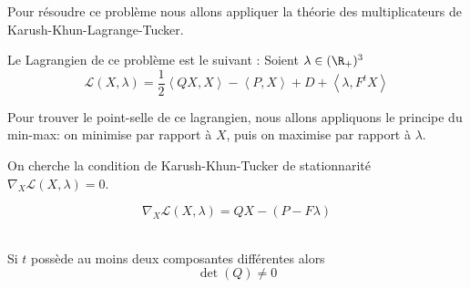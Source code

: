 Pour résoudre ce problème nous allons appliquer la théorie des multiplicateurs de Karush-Khun-Lagrange-Tucker. 

Le Lagrangien de ce problème est le suivant :
Soient $\lambda \in (\R_+)^3$ 
\begin{equation}
\mathcal{L}(X,\lambda) = \frac{1}{2}\left<Q X, X\right>  - \left<P, X\right> + D + \left<\lambda, F^tX\right>
\end{equation}

Pour trouver le point-selle de ce lagrangien, nous allons appliquons le principe du min-max: on minimise par rapport à $X$, puis on maximise par rapport à $\lambda$.

On cherche la condition de Karush-Khun-Tucker de stationnarité $\nabla_X \mathcal L (X,\lambda) = 0$.

\begin{equation}
\nabla_X \mathcal{L}(X,\lambda) = Q X - (P - F\lambda)
\end{equation}


\begin{prop}[Inversibilité de $Q$]~\\

Si $t$ possède au moins deux composantes différentes alors
\begin{equation}
\det(Q) \not = 0
\end{equation}
\end{prop}

